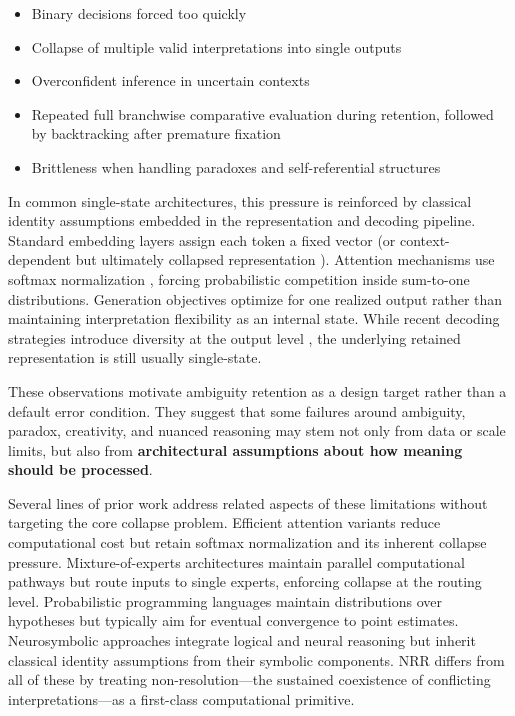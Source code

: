 \documentclass[11pt,a4paper]{article}
\begin{document}
\begin{itemize}
\item Binary decisions forced too quickly
\item Collapse of multiple valid interpretations into single outputs
\item Overconfident inference in uncertain contexts
\item Repeated full branchwise comparative evaluation during retention, followed by backtracking after premature fixation
\item Brittleness when handling paradoxes and self-referential structures
\end{itemize}

In common single-state architectures, this pressure is reinforced by classical identity assumptions embedded in the representation and decoding pipeline.
Standard embedding layers assign each token a fixed vector (or context-dependent but ultimately collapsed representation \cite{peters2018deep}).
Attention mechanisms use softmax normalization \cite{vaswani2017attention}, forcing probabilistic competition inside sum-to-one distributions.
Generation objectives optimize for one realized output rather than maintaining interpretation flexibility as an internal state.
While recent decoding strategies introduce diversity at the output level \cite{holtzman2020curious, li2023contrastive}, the underlying retained representation is still usually single-state.

These observations motivate ambiguity retention as a design target rather than a default error condition.
They suggest that some failures around ambiguity, paradox, creativity, and nuanced reasoning may stem not only from data or scale limits, but also from \textbf{architectural assumptions about how meaning should be processed}.

Several lines of prior work address related aspects of these limitations without targeting the core collapse problem.
Efficient attention variants \cite{child2019generating, dao2022flashattention} reduce computational cost but retain softmax normalization and its inherent collapse pressure.
Mixture-of-experts architectures \cite{shazeer2017outrageously} maintain parallel computational pathways but route inputs to single experts, enforcing collapse at the routing level.
Probabilistic programming languages \cite{goodman2008church} maintain distributions over hypotheses but typically aim for eventual convergence to point estimates.
Neurosymbolic approaches \cite{garcez2020neural} integrate logical and neural reasoning but inherit classical identity assumptions from their symbolic components.
NRR differs from all of these by treating non-resolution---the sustained coexistence of conflicting interpretations---as a first-class computational primitive.
\end{document}
